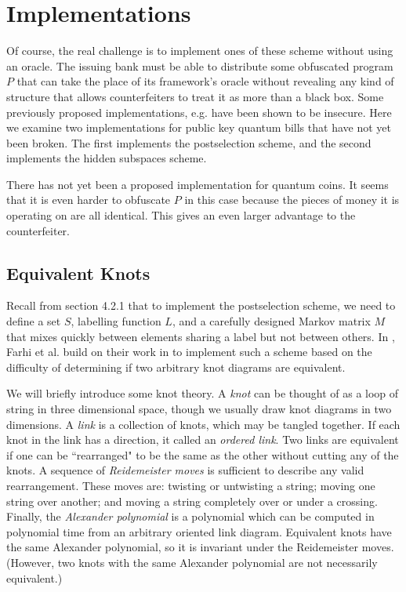 \documentclass[12pt]{article}
\begin{document}
\section{Implementations}
Of course, the real challenge is to implement ones of these scheme without using an oracle.  The issuing bank must be able to distribute some obfuscated program $P$ that can take the place of its framework's oracle without revealing any kind of structure that allows counterfeiters to treat it as more than a black box.  Some previously proposed implementations, e.g. \cite{Aar09} have been shown to be insecure.  Here we examine two implementations for public key quantum bills that have not yet been broken.  The first implements the postselection scheme, and the second implements the hidden subspaces scheme.

There has not yet been a proposed implementation for quantum coins.  It seems that it is even harder to obfuscate $P$ in this case because the pieces of money it is operating on are all identical.  This gives an even larger advantage to the counterfeiter.

\subsection{Equivalent Knots}
Recall from section 4.2.1 that to implement the postselection scheme, we need to define a set $S$,  labelling function $L$, and a carefully designed Markov matrix $M$ that mixes quickly between elements sharing a label but not between others.  In \cite{Far12}, Farhi et al. build on their work in \cite{Lut09} to implement such a scheme based on the difficulty of determining if two arbitrary knot diagrams are equivalent.

We will briefly introduce some knot theory.  A \emph{knot} can be thought of as a loop of string in three dimensional space, though we usually draw knot diagrams in two dimensions.  A \emph{link} is a collection of knots, which may be tangled together.  If each knot in the link has a direction, it called an \emph{ordered link}.  Two links are equivalent if one can be ``rearranged" to be the same as the other without cutting any of the knots.  A sequence of \emph{Reidemeister moves} is sufficient to describe any valid rearrangement.  These moves are: twisting or untwisting a string; moving one string over another; and moving a string completely over or under a crossing.  Finally, the \emph{Alexander polynomial} is a polynomial which can be computed in polynomial time from an arbitrary oriented link diagram.  Equivalent knots have the same Alexander polynomial, so it is invariant under the Reidemeister moves.  (However, two knots with the same Alexander polynomial are not necessarily equivalent.)
\end{document}
